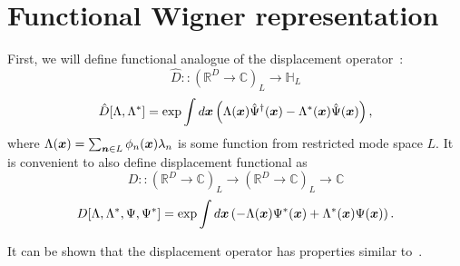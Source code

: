 \section{Functional Wigner representation}

First, we will define functional analogue of the displacement operator~:
\[
	\hat{D} ::
	(\mathbb{R}^D \rightarrow \mathbb{C})_L
	\rightarrow
	\mathbb{H}_L
\]
\[
	\hat{D}[\Lambda, \Lambda^*] = \exp \int d\boldsymbol{x} \left(
		\Lambda(\boldsymbol{x}) \hat{\Psi}^\dagger(\boldsymbol{x}) - \Lambda^*(\boldsymbol{x}) \hat{\Psi}(\boldsymbol{x})
	\right),
\]
where $\Lambda(\boldsymbol{x}) = \sum_{\boldsymbol{n} \in L} \phi_n(\boldsymbol{x}) \lambda_n$ is some function from restricted mode space $L$.
It is convenient to also define displacement functional as
\[
	D ::
	(\mathbb{R}^D \rightarrow \mathbb{C})_L
	\rightarrow
	(\mathbb{R}^D \rightarrow \mathbb{C})_L
	\rightarrow
	\mathbb{C}
\]
\[
	D[\Lambda, \Lambda^*, \Psi, \Psi^*] = \exp \int d\boldsymbol{x} \left(
		-\Lambda(\boldsymbol{x}) \Psi^*(\boldsymbol{x}) + \Lambda^*(\boldsymbol{x}) \Psi(\boldsymbol{x})
	\right).
\]

It can be shown that the displacement operator has properties similar to~.

